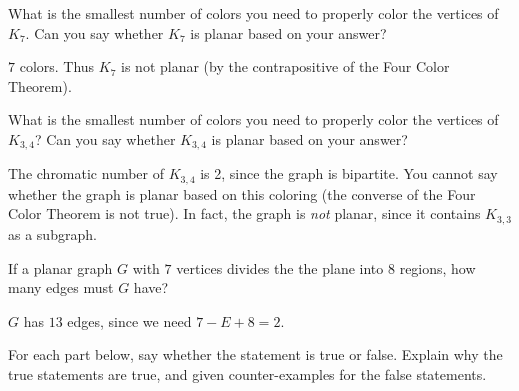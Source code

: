 \begin{squestions}
\question What is the smallest number of colors you need to properly color the vertices of $K_{7}$.  Can you say whether $K_7$ is planar based on your answer?

  \begin{answer}
  $7$ colors.  Thus $K_7$ is not planar (by the contrapositive of the Four Color Theorem).
  \end{answer}


\question What is the smallest number of colors you need to properly color the vertices of $K_{3,4}$?  Can you say whether $K_{3,4}$ is planar based on your answer?

  \begin{answer}
  The chromatic number of $K_{3,4}$ is 2, since the graph is bipartite.  You cannot say whether the graph is planar based on this coloring (the converse of the Four Color Theorem is not true).  In fact, the graph is {\em not} planar, since it contains $K_{3,3}$ as a subgraph.
  \end{answer}


\question If a planar graph $G$ with $7$ vertices divides the the plane into 8 regions, how many edges must $G$ have?

  \begin{answer}
  $G$ has $13$ edges, since we need $7 - E + 8 = 2$.
  \end{answer}








\question For each part below, say whether the statement is true or false.  Explain why the true statements are true, and given counter-examples for the false statements.
\end{squestions}
